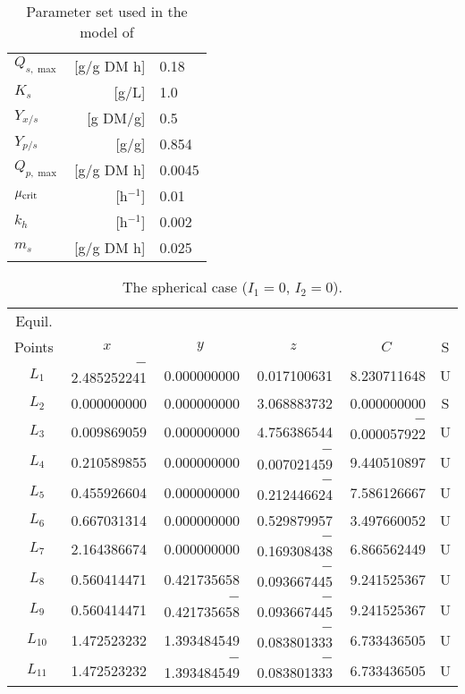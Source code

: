 \documentclass{kluwer}    %
\begin{document}
\begin{article}
\begin{table} %
\begin{tabular}{lrl}                                        
\hline
$Q_{s,\max}$   & [g/g DM h]  & 0.18\\
$K_{s}$       & [g/L]        & 1.0\\
$Y_{x/s}$     & [g DM/g]     & 0.5\\
$Y_{p/s}$     & [g/g]        & 0.854\\
$Q_{p,\max}$   & [g/g DM h]  & 0.0045\\
$\mu_{\rm crit}$  & [h$^{-1}$]  & 0.01\\
$k_{h}$       & [h$^{-1}$]  & 0.002\\
$m_{s}$       & [g/g DM h]  & 0.025\\                              
\hline
\end{tabular}
\caption[]{Parameter set used in the model of }\label{parset}
\end{table}

\begin{table*}
\caption[]{The spherical case ($I_1=0$, $I_2=0$).}
\label{sphericcase}
\begin{tabular}{crrrrc}
\hline
Equil. \\
Points & \multicolumn{1}{c}{$x$} & \multicolumn{1}{c}{$y$} & \multicolumn{1}{c}{$z$} & \multicolumn{1}{c}{$C$} &
S \\
\hline
$~~L_1$ & $-$2.485252241 & 0.000000000 & 0.017100631 & 8.230711648 & U \\
$~~L_2$ &    0.000000000 & 0.000000000 & 3.068883732 & 0.000000000 & S \\
$~~L_3$ &    0.009869059 & 0.000000000 & 4.756386544 & $-$0.000057922 & U \\
$~~L_4$ &    0.210589855 & 0.000000000 & $-$0.007021459 & 9.440510897 & U \\
$~~L_5$ &    0.455926604 & 0.000000000 & $-$0.212446624 & 7.586126667 & U \\
$~~L_6$ &    0.667031314 & 0.000000000 & 0.529879957 & 3.497660052 & U \\
$~~L_7$ &    2.164386674 & 0.000000000 & $-$0.169308438 & 6.866562449 & U \\
$~~L_8$ &    0.560414471 & 0.421735658 & $-$0.093667445 & 9.241525367 & U \\
$~~L_9$ &    0.560414471 & $-$0.421735658 & $-$0.093667445 & 9.241525367 & U
\\
$~~L_{10}$ & 1.472523232 & 1.393484549 & $-$0.083801333 & 6.733436505 & U \\
$~~L_{11}$ & 1.472523232 & $-$1.393484549 & $-$0.083801333 & 6.733436505 & U
\\ \hline
\end{tabular}
\end{table*}



\end{article}
\end{document}
